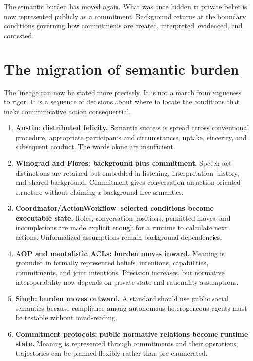 \documentclass[11pt]{article}
\begin{document}
The semantic burden has moved again. What was once hidden in private belief is now represented publicly as a commitment. Background returns at the boundary conditions governing how commitments are created, interpreted, evidenced, and contested.

\section{The migration of semantic burden}
The lineage can now be stated more precisely. It is not a march from vagueness to rigor. It is a sequence of decisions about where to locate the conditions that make communicative action consequential.

\begin{enumerate}[leftmargin=1.6em]
\item \textbf{Austin: distributed felicity.} Semantic success is spread across conventional procedure, appropriate participants and circumstances, uptake, sincerity, and subsequent conduct. The words alone are insufficient. \cite{austin1962things}

\item \textbf{Winograd and Flores: background plus commitment.} Speech-act distinctions are retained but embedded in listening, interpretation, history, and shared background. Commitment gives conversation an action-oriented structure without claiming a background-free semantics. \cite{winogradflores1986understanding}

\item \textbf{Coordinator/ActionWorkflow: selected conditions become executable state.} Roles, conversation positions, permitted moves, and incompletions are made explicit enough for a runtime to calculate next actions. Unformalized assumptions remain background dependencies. \cite{medinamora1992actionworkflow,flores1993conversation}

\item \textbf{AOP and mentalistic ACLs: burden moves inward.} Meaning is grounded in formally represented beliefs, intentions, capabilities, commitments, and joint intentions. Precision increases, but normative interoperability now depends on private state and rationality assumptions. \cite{shoham1993aop,smithcohen1996semantics,fipa2002cal}

\item \textbf{Singh: burden moves outward.} A standard should use public social semantics because compliance among autonomous heterogeneous agents must be testable without mind-reading. \cite{singh1998rethinking}

\item \textbf{Commitment protocols: public normative relations become runtime state.} Meaning is represented through commitments and their operations; trajectories can be planned flexibly rather than pre-enumerated. \cite{yolumsingh2002flexible}
\end{enumerate}
\end{document}
